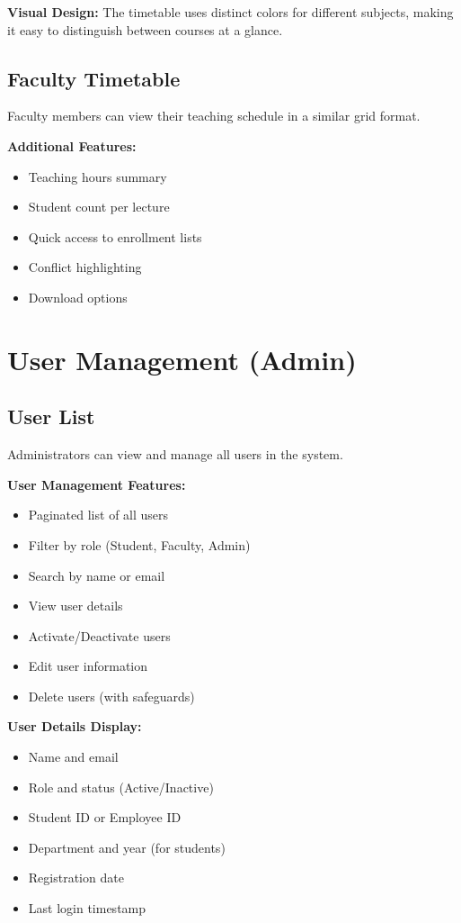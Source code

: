 \textbf{Visual Design:} The timetable uses distinct colors for different subjects, making it easy to distinguish between courses at a glance.

\subsection{Faculty Timetable}
Faculty members can view their teaching schedule in a similar grid format.

\textbf{Additional Features:}
\begin{itemize}
    \item Teaching hours summary
    \item Student count per lecture
    \item Quick access to enrollment lists
    \item Conflict highlighting
    \item Download options
\end{itemize}

\section{User Management (Admin)}

\subsection{User List}
Administrators can view and manage all users in the system.

\textbf{User Management Features:}
\begin{itemize}
    \item Paginated list of all users
    \item Filter by role (Student, Faculty, Admin)
    \item Search by name or email
    \item View user details
    \item Activate/Deactivate users
    \item Edit user information
    \item Delete users (with safeguards)
\end{itemize}

\textbf{User Details Display:}
\begin{itemize}
    \item Name and email
    \item Role and status (Active/Inactive)
    \item Student ID or Employee ID
    \item Department and year (for students)
    \item Registration date
    \item Last login timestamp
\end{itemize}

